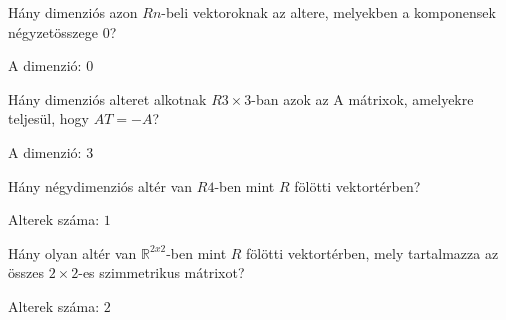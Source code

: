 \begin{frame}
  \begin{tcolorbox}[title={4/4. -R-}]
      Hány dimenziós azon $Rn$-beli vektoroknak az altere, melyekben a komponensek négyzetösszege $0$?
  \tcblower

    \mmedskip 
    
    A dimenzió: $0$
  \end{tcolorbox}
\end{frame}


\begin{frame}
  \begin{tcolorbox}[title={4/5. -Q-}]
      Hány dimenziós alteret alkotnak $R3×3$-ban azok az A mátrixok, amelyekre teljesül, hogy $AT = −A$?
  \tcblower

    \mmedskip 
    
    A dimenzió: $3$
  \end{tcolorbox}
\end{frame}


\begin{frame}
  \begin{tcolorbox}[title={4/6. -R-}]
      Hány négydimenziós altér van $R4$-ben mint $R$ fölötti vektortérben?
  \tcblower

    \mmedskip 
    
    Alterek száma: $1$
  \end{tcolorbox}
\end{frame}


\begin{frame}
  \begin{tcolorbox}[title={4/7. -Q-}]
      Hány olyan altér van $\mathbb{R}^{2 x 2}$-ben mint $R$ fölötti vektortérben, mely tartalmazza az összes $2 × 2$-es szimmetrikus mátrixot?
  \tcblower

    \mmedskip 
    
    Alterek száma: $2$
  \end{tcolorbox}
\end{frame}


